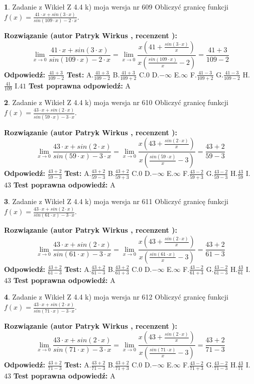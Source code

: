 \documentclass[12pt, a4paper]{article}
\theoremstyle{definition} %
\newtheorem{zad}{}
\newcommand{\zadStart}[1]{\begin{zad}#1\newline}
\newcommand{\zadStop}{\end{zad}}
\newcommand{\rozwStart}[2]{\noindent \textbf{Rozwiązanie (autor #1 , recenzent #2): }\newline}
\newcommand{\rozwStop}{\newline}
\newcommand{\odpStart}{\noindent \textbf{Odpowiedź:}\newline}
\newcommand{\odpStop}{\newline}
\newcommand{\testStart}{\noindent \textbf{Test:}\newline}
\newcommand{\testStop}{\newline}
\newcommand{\kluczStart}{\noindent \textbf{Test poprawna odpowiedź:}\newline}
\newcommand{\kluczStop}{\newline}
\begin{document}
\zadStart{Zadanie z Wikieł Z 4.4 k) moja wersja nr 609}
Obliczyć granicę funkcji $f(x)=\frac{41\cdot x +sin(3\cdot x)}{sin(109\cdot x) -2\cdot x}$.
\zadStop
\rozwStart{Patryk Wirkus}{}
$$\lim\limits_{x\to 0}\frac{41\cdot x +sin(3\cdot x)}{sin(109\cdot x) -2\cdot x}
=\lim\limits_{x\to 0}\frac{x(41+\frac{sin(3\cdot x)}{x})}{x(\frac{sin(109\cdot x)}{x}-2)}
=\frac{41+3}{109-2}$$
\rozwStop
\odpStart
$\frac{41+3}{109-2}$
\odpStop
\testStart
A.$\frac{41+3}{109-2}$
B.$\frac{41+3}{109+2}$
C.$0$
D.$-\infty$
E.$\infty$
F.$\frac{41-3}{109+2}$
G.$\frac{41-3}{109-2}$
H.$\frac{41}{109}$
I.$41$
\testStop
\kluczStart
A
\kluczStop



\zadStart{Zadanie z Wikieł Z 4.4 k) moja wersja nr 610}
Obliczyć granicę funkcji $f(x)=\frac{43\cdot x +sin(2\cdot x)}{sin(59\cdot x) -3\cdot x}$.
\zadStop
\rozwStart{Patryk Wirkus}{}
$$\lim\limits_{x\to 0}\frac{43\cdot x +sin(2\cdot x)}{sin(59\cdot x) -3\cdot x}
=\lim\limits_{x\to 0}\frac{x(43+\frac{sin(2\cdot x)}{x})}{x(\frac{sin(59\cdot x)}{x}-3)}
=\frac{43+2}{59-3}$$
\rozwStop
\odpStart
$\frac{43+2}{59-3}$
\odpStop
\testStart
A.$\frac{43+2}{59-3}$
B.$\frac{43+2}{59+3}$
C.$0$
D.$-\infty$
E.$\infty$
F.$\frac{43-2}{59+3}$
G.$\frac{43-2}{59-3}$
H.$\frac{43}{59}$
I.$43$
\testStop
\kluczStart
A
\kluczStop



\zadStart{Zadanie z Wikieł Z 4.4 k) moja wersja nr 611}
Obliczyć granicę funkcji $f(x)=\frac{43\cdot x +sin(2\cdot x)}{sin(61\cdot x) -3\cdot x}$.
\zadStop
\rozwStart{Patryk Wirkus}{}
$$\lim\limits_{x\to 0}\frac{43\cdot x +sin(2\cdot x)}{sin(61\cdot x) -3\cdot x}
=\lim\limits_{x\to 0}\frac{x(43+\frac{sin(2\cdot x)}{x})}{x(\frac{sin(61\cdot x)}{x}-3)}
=\frac{43+2}{61-3}$$
\rozwStop
\odpStart
$\frac{43+2}{61-3}$
\odpStop
\testStart
A.$\frac{43+2}{61-3}$
B.$\frac{43+2}{61+3}$
C.$0$
D.$-\infty$
E.$\infty$
F.$\frac{43-2}{61+3}$
G.$\frac{43-2}{61-3}$
H.$\frac{43}{61}$
I.$43$
\testStop
\kluczStart
A
\kluczStop



\zadStart{Zadanie z Wikieł Z 4.4 k) moja wersja nr 612}
Obliczyć granicę funkcji $f(x)=\frac{43\cdot x +sin(2\cdot x)}{sin(71\cdot x) -3\cdot x}$.
\zadStop
\rozwStart{Patryk Wirkus}{}
$$\lim\limits_{x\to 0}\frac{43\cdot x +sin(2\cdot x)}{sin(71\cdot x) -3\cdot x}
=\lim\limits_{x\to 0}\frac{x(43+\frac{sin(2\cdot x)}{x})}{x(\frac{sin(71\cdot x)}{x}-3)}
=\frac{43+2}{71-3}$$
\rozwStop
\odpStart
$\frac{43+2}{71-3}$
\odpStop
\testStart
A.$\frac{43+2}{71-3}$
B.$\frac{43+2}{71+3}$
C.$0$
D.$-\infty$
E.$\infty$
F.$\frac{43-2}{71+3}$
G.$\frac{43-2}{71-3}$
H.$\frac{43}{71}$
I.$43$
\testStop
\kluczStart
A
\kluczStop
\end{document}
